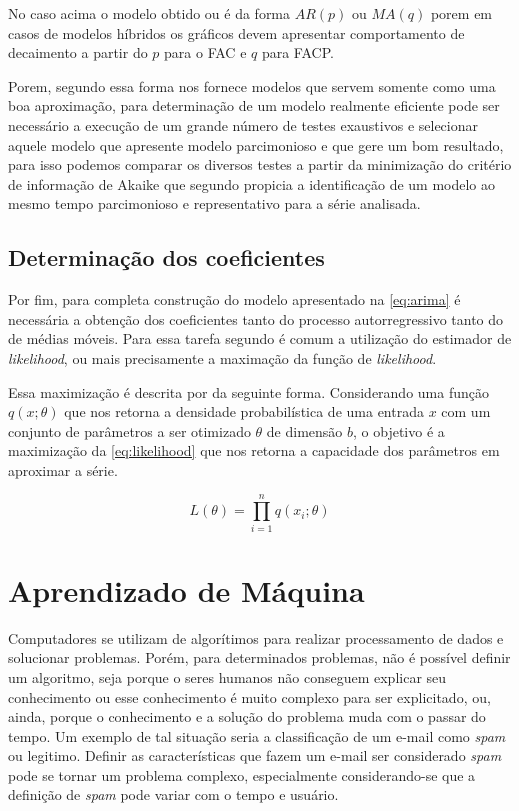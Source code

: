 \documentclass[
    12pt,
    oneside,
    a4paper,
    english,
    brazil
]{abntex2}
\begin{document}
No caso acima o  modelo obtido ou é da forma $AR(p)$ ou  $MA(q)$ porem em casos
de modelos híbridos os gráficos  devem apresentar comportamento de decaimento a
partir do $p$ para o FAC e $q$ para FACP\@.

Porem, segundo   essa  forma nos  fornece modelos  que servem
somente  como uma  boa aproximação,  para determinação  de um  modelo realmente
eficiente  pode  ser necessário  a  execução  de  um  grande número  de  testes
exaustivos e selecionar  aquele modelo que apresente modelo  parcimonioso e que
gere  um  bom resultado,  para  isso  podemos  comparar  os diversos  testes  a
partir  da  minimização  do  critério  de  informação  de  Akaike  que  segundo
  propicia  a identificação  de  um  modelo ao  mesmo  tempo
parcimonioso e representativo para a série analisada.

\subsection{Determinação dos coeficientes}

Por fim, para completa construção do modelo apresentado na \autoref{eq:arima} é
necessária  a  obtenção  dos  coeficientes tanto  do  processo  autorregressivo
tanto  do de  médias móveis.  Para essa  tarefa segundo  é
comum a utilização do estimador de \textit{likelihood}, ou mais precisamente a
maximação da função de \textit{likelihood}.

Essa  maximização   é  descrita   por     da  seguinte
forma.  Considerando  uma função  $q(x;\theta)$  que  nos retorna  a  densidade
probabilística de uma entrada $x$ com um conjunto de parâmetros a ser otimizado
$\theta$ de dimensão $b$, o objetivo é a maximização da \autoref{eq:likelihood}
que nos retorna a capacidade dos parâmetros em aproximar a série.

\begin{equation}\label{eq:likelihood}
    L(\theta) = \prod_{i=1}^{n}{q(x_i;\theta)}
\end{equation}

\section{Aprendizado de Máquina}

Computadores se utilizam de algorítimos para realizar processamento de dados e solucionar problemas.  Porém, para  determinados  problemas,  não é possível definir um algoritmo, seja porque o seres humanos não conseguem explicar seu conhecimento ou esse conhecimento é muito complexo para ser explicitado, ou, ainda, porque o conhecimento e a solução do problema muda com o passar do tempo. Um exemplo de tal situação seria a classificação de  um e-mail como \textit{spam} ou legitimo. Definir as características que fazem um e-mail ser considerado \textit{spam} pode se  tornar um problema  complexo, especialmente considerando-se que a definição de \textit{spam} pode variar com o tempo e usuário.
\end{document}
